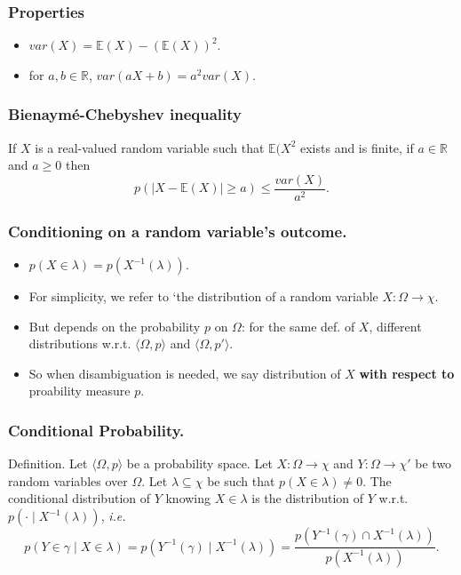 \documentclass{beamer}
\begin{document}
\begin{frame}
  \frametitle{Properties}
  \begin{itemize}
  \item $var(X) = \mathbb{E}(X) - (\mathbb{E}(X))^2$.
  \item for $a, b \in \mathbb{R}$, $var(aX + b) = a^2var(X)$.
  \end{itemize}
\end{frame}

\begin{frame}
  \frametitle{Bienaym\'e-Chebyshev inequality}
  If $X$ is a real-valued random variable such that $\mathbb{E}(X^2$ exists and is finite, if $a \in \mathbb{R}$ and $a \ge 0$ then
  \[p(|X - \mathbb{E}(X)| \ge a) \le \frac{var(X)}{a^2}.\]
\end{frame}

\begin{frame}
  \frametitle{Conditioning on a random variable's outcome.}
  \begin{itemize}
  \item $p(X \in \lambda) = p(X^{-1}(\lambda))$.
  \item For simplicity, we refer to `the distribution of a random variable $X: \Omega \rightarrow \chi$.
  \item But depends on the probability $p$ on $\Omega$: for the same def. of $X$, different distributions w.r.t. $\langle \Omega, p \rangle$ and $\langle \Omega, p' \rangle$.
  \item So when disambiguation is needed, we say distribution of $X$ \textbf{with respect to} proability measure $p$.
  \end{itemize}
\end{frame}

\begin{frame}
  \frametitle{Conditional Probability.}

  \begin{block}{Definition.}
    Let $\langle \Omega, p \rangle$ be a probability space. Let $X: \Omega \rightarrow \chi$ and $Y: \Omega \rightarrow \chi'$ be two random variables over $\Omega$. Let $\lambda \subseteq \chi$ be such that $p(X \in \lambda) \neq 0$.
    The conditional distribution of $Y$ knowing $X \in \lambda$ is the distribution of $Y$ w.r.t. $p( \cdot \mid X^{-1}(\lambda))$, \emph{i.e.}
    \[p(Y \in \gamma \mid X \in \lambda) = p(Y^{-1}(\gamma) \mid X^{-1}(\lambda)) = \frac{p(Y^{-1}(\gamma) \cap X^{-1}(\lambda))}{p(X^{-1}(\lambda))}.\]
  \end{block}
\end{frame}
\end{document}
